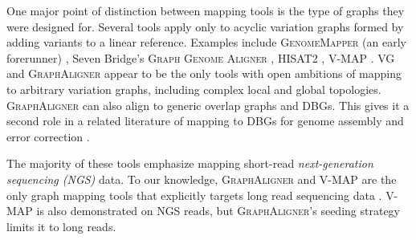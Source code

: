 




One major point of distinction between mapping tools is the type of graphs they were designed for. 
Several tools apply only to acyclic variation graphs formed by adding variants to a linear reference.
Examples include \textsc{GenomeMapper} (an early forerunner) \cite{Schneeberger_2009}, Seven Bridge's \textsc{Graph Genome Aligner} \cite{Rakocevic_2019}, \textsc{HISAT2} \cite{Kim_2019}, \textsc{V-MAP} \cite{Vaddadi_2019}.
\textsc{VG} \cite{Garrison_2019} and \textsc{GraphAligner} \cite{Rautiainen_2019b} appear to be the only tools with open ambitions of mapping to arbitrary variation graphs, including complex local and global topologies.
\textsc{GraphAligner} can also align to generic overlap graphs and DBGs.
This gives it a second role in a related literature of mapping to DBGs for genome assembly and error correction \cite{Heydari_2018, Fu2019ErrorCorrectionSurvey}.

The majority of these tools emphasize mapping short-read \emph{next-generation sequencing (NGS)} data. 
To our knowledge, \textsc{GraphAligner} and \textsc{V-MAP} are the only graph mapping tools that explicitly targets long read sequencing data \cite{Rautiainen_2019b, Vaddadi_2019}.
\textsc{V-MAP} is also demonstrated on NGS reads, but \textsc{GraphAligner}'s seeding strategy limits it to long reads.

